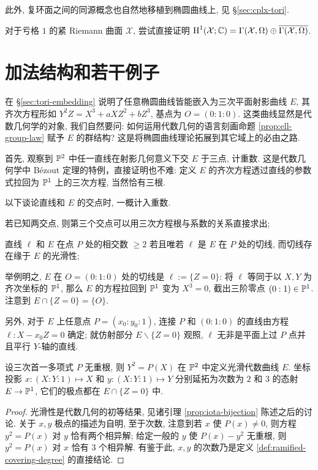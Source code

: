 此外, 复环面之间的同源概念也自然地移植到椭圆曲线上, 见 \S\ref{sec:cplx-tori}. 

\begin{exercise}
	对于亏格 $1$ 的紧 Riemann 曲面 $\mathcal{X}$, 尝试直接证明 $\operatorname{H}^1(\mathcal{X}; \mathbb{C}) = \Gamma(\mathcal{X}, \Omega) \oplus \overline{\Gamma(\mathcal{X}, \Omega)}$.
\end{exercise}

\section{加法结构和若干例子}\label{sec:addition}
在 \S\ref{sec:tori-embedding} 说明了任意椭圆曲线皆能嵌入为三次平面射影曲线 $E$, 其齐次方程形如 $Y^2 Z = X^3 + aXZ^2 + bZ^3$, 基点为 $O = (0:1:0)$. 这类曲线显然是代数几何学的对象, 我们自然要问: 如何运用代数几何的语言刻画命题 \ref{prop:ell-group-law} 赋予 $E$ 的群结构? 这是将椭圆曲线理论拓展到其它域上的必由之路.

首先, 观察到 $\mathbb{P}^2$ 中任一直线在射影几何意义下交 $E$ 于三点, 计重数. 这是代数几何学中 Bézout 定理的特例，直接证明也不难: 定义 $E$ 的齐次方程透过直线的参数式拉回为 $\mathbb{P}^1$ 上的三次方程, 当然恰有三根.

以下谈论直线和 $E$ 的交点时, 一概计入重数.
\begin{compactitem}
	\item 若已知两交点, 则第三个交点可以用三次方程根与系数的关系直接求出;
	\item 直线 $\ell$ 和 $E$ 在点 $P$ 处的相交数 $\geq 2$ 若且唯若 $\ell$ 是 $E$ 在 $P$ 处的切线, 而切线存在缘于 $E$ 的光滑性;
\end{compactitem}

\begin{example}\label{eg:line-intersection}
	举例明之, $E$ 在 $O = (0:1:0)$ 处的切线是 $\ell := \{Z=0\}$: 将 $\ell$ 等同于以 $X, Y$ 为齐次坐标的 $\mathbb{P}^1$, 那么 $E$ 的方程拉回到 $\mathbb{P}^1$ 变为 $X^3=0$, 截出三阶零点 $(0:1) \in \mathbb{P}^1$. 注意到 $E \cap \{Z = 0\} = \{O\}$.
	
	另外, 对于 $E$ 上任意点 $P = (x_0 : y_0 : 1)$, 连接 $P$ 和 $(0:1:0)$ 的直线由方程 $\ell: X - x_0 Z = 0$ 确定; 就仿射部分 $E \smallsetminus \{Z=0\}$ 观照, $\ell$ 无非是平面上过 $P$ 点并且平行 $Y$-轴的直线.
\end{example}

\begin{lemma}\label{prop:X-Y-proj}
	设三次首一多项式 $P$ 无重根, 则 $Y^2 = P(X)$ 在 $\mathbb{P}^2$ 中定义光滑代数曲线 $E$. 坐标投影 $x: (X:Y:1) \mapsto X$ 和 $y: (X:Y:1) \mapsto Y$ 分别延拓为次数为 $2$ 和 $3$ 的态射 $E \to \mathbb{P}^1$, 它们的极点都在 $E \cap \{Z=0\}$ 中.
\end{lemma}
\begin{proof}
	光滑性是代数几何的初等结果, 见诸引理 \ref{prop:iota-bijection} 陈述之后的讨论. 关于 $x,y$ 极点的描述为自明, 至于次数, 注意到若 $x$ 使 $P(x) \neq 0$, 则方程 $y^2 = P(x)$ 对 $y$ 恰有两个相异解; 给定一般的 $y$ 使 $P(x) - y^2$ 无重根, 则 $y^2 = P(x)$ 对 $x$ 恰有 $3$ 个相异解. 有鉴于此, $x,y$ 的次数乃是定义 \ref{def:ramified-covering-degree} 的直接结论.
\end{proof}

